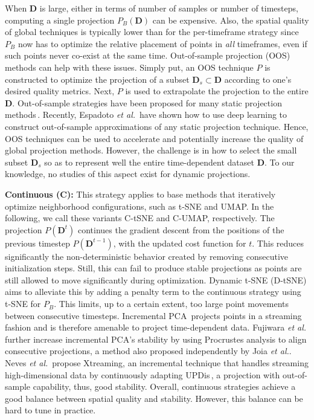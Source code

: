 When $\mathbf{D}$ is large, either in terms of number of samples or number of timesteps, computing a single projection $P_B(\mathbf{D})$ can be expensive. Also, the spatial quality of global techniques is typically lower than for the per-timeframe strategy since $P_B$ now has to optimize the relative placement of points in \emph{all} timeframes, even if such points never co-exist at the same time. Out-of-sample projection (OOS) methods can help with these issues. Simply put, an OOS technique $P$ is constructed to optimize the projection of a subset $\mathbf{D}_s \subset \mathbf{D}$ according to one's desired quality metrics. Next, $P$ is used to extrapolate the projection to the entire $\mathbf{D}$. Out-of-sample strategies have been proposed for many static projection methods\,\cite{oos}. Recently, Espadoto \emph{et al.}\,\cite{nnp} have shown how to use deep learning to construct out-of-sample approximations of any static projection technique. Hence, OOS techniques can be used to accelerate and potentially increase the quality of global projection methods. However, the challenge is in how to select the small subset $\mathbf{D}_s$ so as to represent well the entire time-dependent dataset $\mathbf{D}$. To our knowledge, no studies of this aspect exist for dynamic projections.

\noindent\textbf{Continuous (C):} This strategy applies to base methods that iteratively optimize neighborhood configurations, such as t-SNE and UMAP. In the following, we call these variants C-tSNE and C-UMAP, respectively. The projection $P(\mathbf{D}^{t})$ continues the gradient descent from the positions of the previous timestep $P(\mathbf{D}^{t-1})$, with the updated cost function for $t$. This reduces significantly the non-deterministic behavior created by removing consecutive initialization steps. Still, this can fail to produce stable projections as points are still allowed to move significantly during optimization. Dynamic t-SNE (D-tSNE)\,\cite{Rauber2016} aims to alleviate this by adding a penalty term to the continuous strategy using t-SNE for $P_B$. This limits, up to a certain extent, too large point movements between consecutive timesteps.
Incremental PCA\,\cite{ross08} projects points in a streaming fashion and is therefore amenable to project time-dependent data. Fujiwara \emph{et al.}\,\cite{Fujiwara2020} further increase incremental PCA's stability by using Procrustes analysis to align consecutive projections, a method also proposed independently by Joia \emph{et al.}\cite{Joia2011}. Neves \emph{et al.}\,\cite{Neves2020} propose Xtreaming, an incremental technique that handles streaming high-dimensional data by continuously adapting UPDis\,\cite{updis}, a projection with out-of-sample capability, thus, good stability. Overall, continuous strategies achieve a good balance between spatial quality and stability. However, this balance can be hard to tune in practice. 

